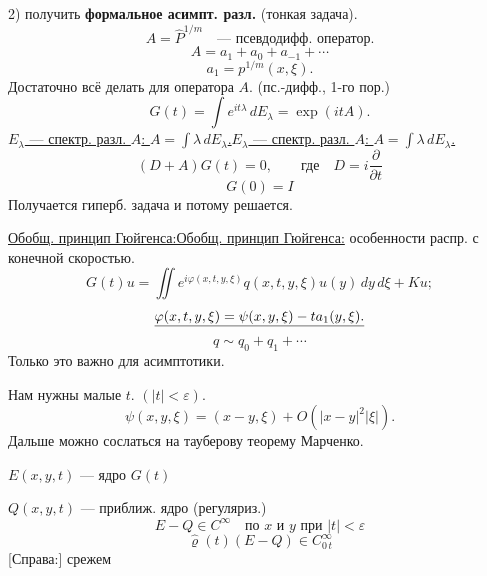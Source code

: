 \documentclass[11pt]{article}
\theoremstyle{definition}
\theoremstyle{remark}
\let\DiplomaticMathUnderline\underline
\renewcommand{\underline}[1]{\ifmmode\DiplomaticMathUnderline{#1}\else\uline{#1}\fi}
\begin{document}
2) получить \textbf{формальное асимпт. разл.} (тонкая задача).
\begin{equation*}
A=\hat P^{1/m}\quad\text{--- псевдодифф. оператор.}
\end{equation*}
\begin{equation*}
A=a_1+a_0+a_{-1}+\cdots
\end{equation*}
\begin{equation*}
a_1=p^{1/m}(x,\xi).
\end{equation*}
Достаточно всё делать для оператора $A$. (пс.-дифф., 1-го пор.)
\begin{equation*}
G(t)=\int e^{it\lambda}\,dE_\lambda=\exp(itA).
\end{equation*}
\underline{$E_\lambda$ --- спектр. разл. $A$: $A=\int\lambda\,dE_\lambda$.}
\begin{equation*}
(D+A)G(t)=0,\qquad\text{где}\quad D=i\frac{\partial}{\partial t}
\end{equation*}
\begin{equation*}
G(0)=I
\end{equation*}
Получается гиперб. задача и потому решается.

\underline{Обобщ. принцип Гюйгенса:} особенности распр. с конечной скоростью.
\begin{equation*}
G(t)u=\iint e^{i\varphi(x,t,y,\xi)}q(x,t,y,\xi)u(y)\,dy\,d\xi+Ku;
\end{equation*}
\begin{equation*}
\underline{\varphi(x,t,y,\xi)=\psi(x,y,\xi)-ta_1(y,\xi).}
\end{equation*}
\begin{equation*}
q\sim q_0+q_1+\cdots
\end{equation*}
Только это важно для асимптотики.

Нам нужны малые $t$. $(|t|<\varepsilon)$.
\begin{equation*}
\psi(x,y,\xi)=(x-y,\xi)+O(|x-y|^2|\xi|).
\end{equation*}
Дальше можно сослаться на тауберову теорему Марченко.

$E(x,y,t)$ --- ядро $G(t)$

$Q(x,y,t)$ --- приближ. ядро (регуляриз.)
\begin{equation*}
E-Q\in C^\infty\quad\text{по $x$ и $y$ при $|t|<\varepsilon$}
\end{equation*}
\begin{equation*}
\hat\varrho(t)(E-Q)\in C^\infty_{0\,t}
\end{equation*}
[Справа:] срежем
\end{document}
